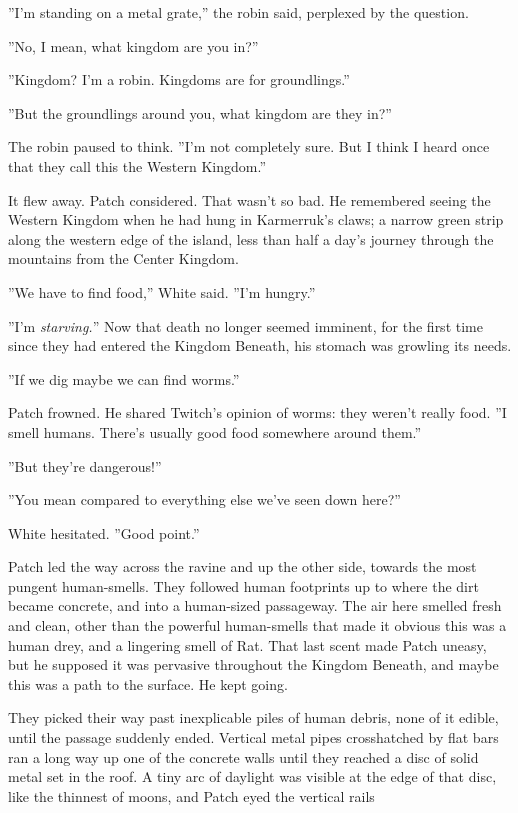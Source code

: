 \documentclass[11pt]{article}
\begin{document}
 ''I'm standing on a metal grate,'' the robin said, perplexed by the question.\par
 ''No, I mean, what kingdom are you in?''\par
 ''Kingdom? I'm a robin. Kingdoms are for groundlings.''\par
 ''But the groundlings around you, what kingdom are they in?''\par
 The robin paused to think. ''I'm not completely sure. But I think I heard once that they call this the Western Kingdom.''\par
 It flew away. Patch considered. That wasn't so bad. He remembered seeing the Western Kingdom when he had hung in Karmerruk's claws; a narrow green strip along the western edge of the island, less than half a day's journey through the mountains from the Center Kingdom.\par
 ''We have to find food,'' White said. ''I'm hungry.''\par
 ''I'm {\it starving.}'' Now that death no longer seemed imminent, for the first time since they had entered the Kingdom Beneath, his stomach was growling its needs.\par
 ''If we dig maybe we can find worms.''\par
 Patch frowned. He shared Twitch's opinion of worms: they weren't really food. ''I smell humans. There's usually good food somewhere around them.''\par
 ''But they're dangerous!''\par
 ''You mean compared to everything else we've seen down here?''\par
 White hesitated. ''Good point.''\par
 Patch led the way across the ravine and up the other side, towards the most pungent human-smells. They followed human footprints up to where the dirt became concrete, and into a human-sized passageway. The air here smelled fresh and clean, other than the powerful human-smells that made it obvious this was a human drey, and a lingering smell of Rat. That last scent made Patch uneasy, but he supposed it was pervasive throughout the Kingdom Beneath, and maybe this was a path to the surface. He kept going.\par
 They picked their way past inexplicable piles of human debris, none of it edible, until the passage suddenly ended. Vertical metal pipes crosshatched by flat bars ran a long way up one of the concrete walls until they reached a disc of solid metal set in the roof. A tiny arc of daylight was visible at the edge of that disc, like the thinnest of moons, and Patch eyed the vertical rails %
\end{document}
